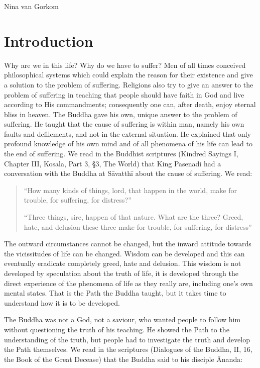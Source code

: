 \documentclass{book}
\begin{document}
Nina van Gorkom
\mainmatter

\chapter{Introduction}

Why are we in this life? Why do we have to suffer? Men of all times
conceived philosophical systems which could explain the reason for their
existence and give a solution to the problem of suffering. Religions
also try to give an answer to the problem of suffering in teaching that
people should have faith in God and live according to His
com­mand­ments; consequently one can, after death, enjoy eternal bliss
in heaven. The Buddha gave his own, unique answer to the problem of
suffering. He taught that the cause of suffering is within man, namely
his own faults and defilements, and not in the external situation. He
explained that only profound knowledge of his own mind and of all
phenomena of his life can lead to the end of suffering. We read in the
Buddhist scriptures (Kindred Sayings I, Chapter III, Kosala, Part 3, §3,
The World) that King Pasenadi had a conversation with the Buddha at
Sāvatthī about the cause of suffering. We read:

\begin{quote}
``How many kinds of things, lord, that happen in the world, make for
trouble, for suffering, for distress?''

``Three things, sire, happen of that nature. What are the three? Greed,
hate, and delusion-these three make for trouble, for suffering, for
distress''
\end{quote}

The outward circumstances cannot be changed, but the inward attitude
towards the vicissitudes of life can be changed. Wisdom can be developed
and this can eventually eradicate completely greed, hate and delusion.
This wisdom is not developed by speculation about the truth of life, it
is developed through the direct experience of the phenomena of life as
they really are, including one's own mental states. That is the Path the
Buddha taught, but it takes time to understand how it is to be
developed.

The Buddha was not a God, not a saviour, who wanted people to follow him
without questioning the truth of his teaching. He showed the Path to the
understanding of the truth, but people had to investigate the truth and
develop the Path themselves. We read in the scrip­tures (Dialogues of
the Buddha, II, 16, the Book of the Great Decease) that the Buddha said
to his disciple Ānanda:
\end{document}

